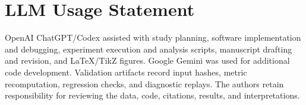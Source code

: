 \section*{LLM Usage Statement}
OpenAI ChatGPT/Codex assisted with study planning, software implementation and debugging, experiment execution and analysis scripts, manuscript drafting and revision, and LaTeX/TikZ figures. Google Gemini was used for additional code development. Validation artifacts record input hashes, metric recomputation, regression checks, and diagnostic replays. The authors retain responsibility for reviewing the data, code, citations, results, and interpretations.

